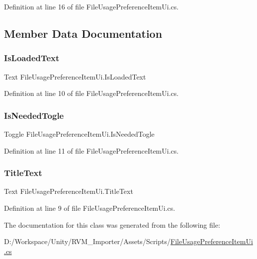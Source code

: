 Definition at line 16 of file File\+Usage\+Preference\+Item\+Ui.\+cs.



\subsection{Member Data Documentation}
\mbox{\label{class_file_usage_preference_item_ui_a386a29774b430691d60023ab5d25184b}} 
\subsubsection{\texorpdfstring{IsLoadedText}{IsLoadedText}}
{\footnotesize\ttfamily Text File\+Usage\+Preference\+Item\+Ui.\+Is\+Loaded\+Text}



Definition at line 10 of file File\+Usage\+Preference\+Item\+Ui.\+cs.

\mbox{\label{class_file_usage_preference_item_ui_a19a392fb3640c0767bd4924fdc837f85}} 
\subsubsection{\texorpdfstring{IsNeededTogle}{IsNeededTogle}}
{\footnotesize\ttfamily Toggle File\+Usage\+Preference\+Item\+Ui.\+Is\+Needed\+Togle}



Definition at line 11 of file File\+Usage\+Preference\+Item\+Ui.\+cs.

\mbox{\label{class_file_usage_preference_item_ui_a51179156a86c0980fd228264d8c7acd0}} 
\subsubsection{\texorpdfstring{TitleText}{TitleText}}
{\footnotesize\ttfamily Text File\+Usage\+Preference\+Item\+Ui.\+Title\+Text}



Definition at line 9 of file File\+Usage\+Preference\+Item\+Ui.\+cs.



The documentation for this class was generated from the following file\+:\begin{DoxyCompactItemize}
\item 
D\+:/\+Workspace/\+Unity/\+R\+V\+M\+\_\+\+Importer/\+Assets/\+Scripts/\mbox{\hyperlink{_file_usage_preference_item_ui_8cs}{File\+Usage\+Preference\+Item\+Ui.\+cs}}\end{DoxyCompactItemize}
